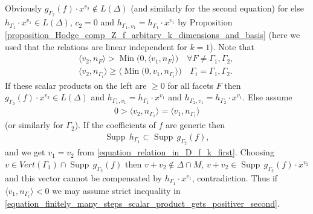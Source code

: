 \documentclass[12pt, english]{article}
\DeclareMathOperator{\Min}{Min}
\DeclareMathOperator{\Supp}{Supp}
\begin{document}
\\ \\
Obviously $g_{\Gamma_2}(f) \cdot x^{v_2} \notin L(\Delta)$ (and similarly for the second equation) for else $h_{\Gamma_1} \cdot x^{v_1} \in L(\Delta)$, $c_2 = 0$ and $h_{\Gamma_1,v_1} = h_{\Gamma_1} \cdot x^{v_1}$ by Proposition \ref{proposition_Hodge_comp_Z_f_arbitary_k_dimensions_and_basis} (here we used that the relations are linear independent for $k=1$).
Note that 
\begin{align} 
	& \langle v_2,n_F \rangle > \Min \big( 0, \langle v_1,n_F \rangle \big) \quad \forall F \neq \Gamma_1,\Gamma_2, \quad \label{equation_finitely_many_steps_scalar_product_gets_positiver} \\
	& \langle v_2,n_{\Gamma_i} \rangle \geq \langle \Min \big( 0, v_1,n_{\Gamma_i} \rangle \big)  \quad  \Gamma_i = \Gamma_1,\Gamma_2. \label{equation_finitely_many_steps_scalar_product_gets_positiver_second}
\end{align}
If these scalar products on the left are $\geq 0$ for all facets $F$ then $g_{\Gamma_2}(f) \cdot x^{v_2} \in L(\Delta)$ and $h_{\Gamma_1,v_1} = h_{\Gamma_1} \cdot x^{v_1}$ and $h_{\Gamma_2,v_1} = h_{\Gamma_2} \cdot x^{v_1}$. Else assume 
\begin{align*}
	0 > \langle v_2,n_{\Gamma_1} \rangle = \langle v_1,n_{\Gamma_1} \rangle
\end{align*}
(or similarly for $\Gamma_2$). If the coefficients of $f$ are generic then
\begin{align*}
	\Supp \, h_{\Gamma_1} \subset \Supp \, g_{\Gamma_2}(f),
\end{align*} 
and we get $v_1 = v_2$ from \ref{equation_relation_in_D_f_k_first}. Choosing $v \in Vert(\Gamma_1) \cap \Supp \, g_{\Gamma_2}(f)$ then $v+v_2 \notin \Delta \cap M$, $v+v_2 \in \Supp \, g_{\Gamma_2}(f) \cdot x^{v_2}$ and this vector cannot be compensated by $h_{\Gamma_1} \cdot x^{v_1}$, contradiction. Thus if $\langle v_1,n_{\Gamma_i} \rangle < 0$ we may assume strict inequality in \ref{equation_finitely_many_steps_scalar_product_gets_positiver_second}.
\leavevmode
\\ \\
\end{document}
